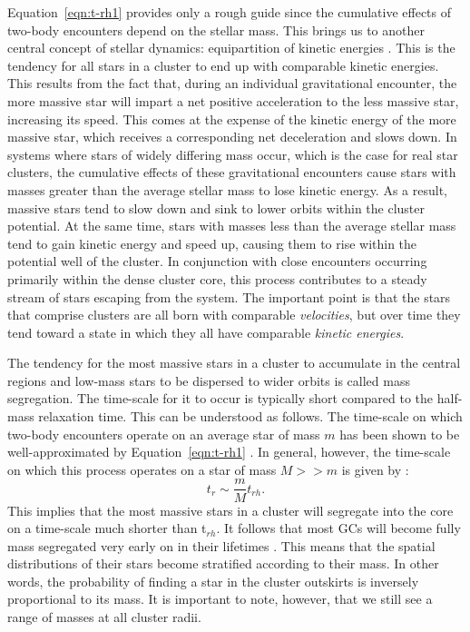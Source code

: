 Equation~\ref{eqn:t-rh1} provides only a rough guide since the
cumulative effects of two-body encounters depend on the stellar mass.
This brings us to another central concept of stellar dynamics:
equipartition of kinetic energies \citep[e.g.][]{henon69, giersz96}.  
This is the tendency for all stars in a cluster to end up with
comparable kinetic energies.  This results from the fact that, during
an individual gravitational encounter, the more massive star will
impart a net positive acceleration to the less massive star,
increasing its speed.  This comes at the expense of the kinetic energy
of the more massive star, which receives a corresponding net
deceleration and slows down.  In systems where stars of widely
differing mass occur, 
which is the case for real star clusters, the cumulative effects of
these gravitational encounters cause stars with masses greater than
the average stellar mass to lose kinetic energy.  As a result, massive
stars tend to slow down and sink to lower orbits within the 
cluster potential.  At the same time, 
stars with masses less than the average stellar mass tend to gain
kinetic energy and speed up, causing them to rise within the potential
well of the cluster.  In conjunction with close encounters occurring
primarily within the dense cluster core, this process contributes to a
steady stream of stars escaping from the system.  The important point
is that the stars that comprise clusters are all born with comparable
\textit{velocities}, but over time they tend toward a state in which they all
have comparable \textit{kinetic energies}.

The tendency for the most massive stars in a cluster to
accumulate in the central regions and low-mass stars to be
dispersed to wider orbits is called mass segregation.  The time-scale
for it to occur is typically short compared to the half-mass
relaxation time.  This can be understood as follows.  The time-scale
on which two-body encounters operate on an average star of mass $m$
has been shown to be well-approximated by Equation~\ref{eqn:t-rh1}
\citep{spitzer87}.  In general, however, the time-scale on which this
process operates on a star of mass $M >> m$ is given by
\citep{vishniac78, spitzer87}: 
\begin{equation}
\label{eqn:mass-segregation}
t_r \sim \frac{m}{M}t_{rh}.
\end{equation}
This implies that the most massive stars in a cluster will segregate
into the core on a time-scale much shorter than t$_{rh}$.  It follows
that most GCs will become fully mass segregated very early on in their
lifetimes \citep[e.g.][]{gaburov08, mcmillan07}.  This means that the
spatial distributions of their stars become stratified according to
their mass.  In other words, the probability of finding a star in the
cluster outskirts is inversely proportional to its mass.  It is
important to note, however, that we still see a range of masses at all
cluster radii.

